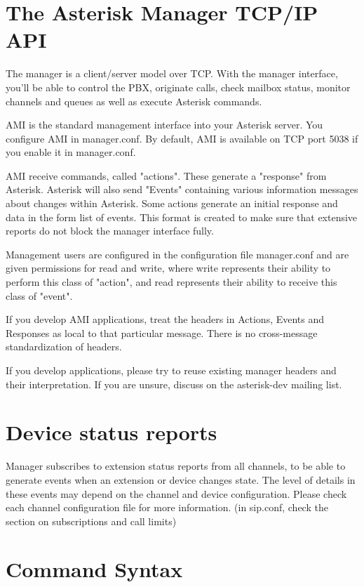 \section{The Asterisk Manager TCP/IP API}

The manager is a client/server model over TCP. With the manager interface,
you'll be able to control the PBX, originate calls, check mailbox status,
monitor channels and queues as well as execute Asterisk commands.

AMI is the standard management interface into your Asterisk server.
You configure AMI in manager.conf. By default, AMI is available on
TCP port 5038 if you enable it in manager.conf.

AMI receive commands, called "actions". These generate a "response"
from Asterisk. Asterisk will also send "Events" containing various
information messages about changes within Asterisk. Some actions
generate an initial response and data in the form list of events.
This format is created to make sure that extensive reports do not
block the manager interface fully.

Management users are configured in the configuration file manager.conf and are 
given permissions for read and write, where write represents their ability 
to perform this class of "action", and read represents their ability to 
receive this class of "event".

If you develop AMI applications, treat the headers
in Actions, Events and Responses as local to that particular
message. There is no cross-message standardization of headers.

If you develop applications, please try to reuse existing manager
headers and their interpretation. If you are unsure, discuss on
the asterisk-dev mailing list.

\section{Device status reports}

Manager subscribes to extension status reports from all channels,
to be able to generate events when an extension or device changes
state. The level of details in these events may depend on the channel
and device configuration. Please check each channel configuration
file for more information. (in sip.conf, check the section on
subscriptions and call limits)


\section{Command Syntax}

